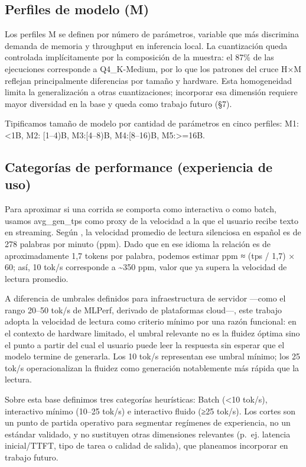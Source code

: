 \documentclass{llncs}
\begin{document}
\subsection{Perfiles de modelo (M)}\label{perfiles-de-modelo-m}

Los perfiles M se definen por número de parámetros, variable que más
discrimina demanda de memoria y throughput en inferencia local. La
cuantización queda controlada implícitamente por la composición de la
muestra: el 87\% de las ejecuciones corresponde a Q4\_K-Medium, por lo
que los patrones del cruce H×M reflejan principalmente diferencias por
tamaño y hardware. Esta homogeneidad limita la generalización a otras
cuantizaciones; incorporar esa dimensión requiere mayor diversidad en la
base y queda como trabajo futuro (§7).

Tipificamos tamaño de modelo por cantidad de parámetros en cinco
perfiles: M1:\textless1B, M2: {[}1--4)B, M3:{[}4--8)B, M4:{[}8--16)B,
M5:\textgreater=16B.

\subsection{Categorías de performance (experiencia de uso)}\label{categoruxedas-de-performance-experiencia-de-uso}

Para aproximar si una corrida se comporta como interactiva o como batch,
usamos avg\_gen\_tps como proxy de la velocidad a la que el usuario
recibe texto en streaming. Según \textcite{brysbaert2019}, la velocidad promedio
de lectura silenciosa en español es de 278 palabras por minuto (ppm). Dado que en ese idioma la relación es de aproximadamente 1,7 tokens por palabra, podemos
estimar ppm ≈ (tps / 1,7) × 60; así, 10 tok/s corresponde a
\textasciitilde350 ppm, valor que ya supera la velocidad de lectura
promedio. 

A diferencia de umbrales definidos para infraestructura de servidor —como el rango 20–50 tok/s de MLPerf, derivado de plataformas cloud—, este trabajo adopta la velocidad de lectura como criterio mínimo por una razón funcional: en el contexto de hardware limitado, el umbral relevante no es la fluidez óptima sino el punto a partir del cual el usuario puede leer la respuesta sin esperar que el modelo termine de generarla. Los 10 tok/s representan ese umbral mínimo; los 25 tok/s operacionalizan la fluidez como generación notablemente más rápida que la lectura.

Sobre esta base definimos tres categorías heurísticas: Batch
(\textless10 tok/s), interactivo mínimo (10--25 tok/s) e interactivo
fluido (≥25 tok/s). Los cortes son un punto de partida operativo para
segmentar regímenes de experiencia, no un estándar validado, y no
sustituyen otras dimensiones relevantes (p.~ej. latencia inicial/TTFT,
tipo de tarea o calidad de salida), que planeamos incorporar en trabajo
futuro.
\end{document}
